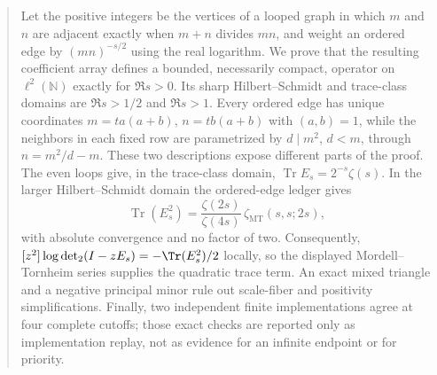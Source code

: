 \begin{abstract}
Let the positive integers be the vertices of a looped graph in which
$m$ and $n$ are adjacent exactly when $m+n$ divides $mn$, and weight an
ordered edge by $(mn)^{-s/2}$ using the real logarithm.  We prove that the
resulting coefficient array defines a bounded, necessarily compact,
operator on $\ell^2(\mathbb N)$ exactly for $\Re s>0$.  Its sharp
Hilbert--Schmidt and trace-class domains are $\Re s>1/2$ and $\Re s>1$.
Every ordered edge has unique coordinates
$m=t a(a+b)$, $n=t b(a+b)$ with $(a,b)=1$, while the neighbors in each
fixed row are parametrized by $d\mid m^2$, $d<m$, through
$n=m^2/d-m$.  These two descriptions expose
different parts of the proof.  The even loops give, in the trace-class
domain,
$\operatorname{Tr}E_s=2^{-s}\zeta(s)$.  In the larger
Hilbert--Schmidt domain the ordered-edge ledger gives
\[
  \operatorname{Tr}(E_s^2)
  =\frac{\zeta(2s)}{\zeta(4s)}\,
    \zeta_{\mathrm{MT}}(s,s;2s),
\]
with absolute convergence and no factor of two.  Consequently,
$[z^2]\log\det_2(I-zE_s)=-\Tr(E_s^2)/2$ locally, so the displayed
Mordell--Tornheim series supplies the quadratic trace term.  An exact mixed
triangle and a negative principal minor rule
out scale-fiber and positivity simplifications.  Finally, two independent
finite implementations agree at four complete cutoffs; those exact checks
are reported only as implementation replay, not as evidence for an
infinite endpoint or for priority.
\end{abstract}
